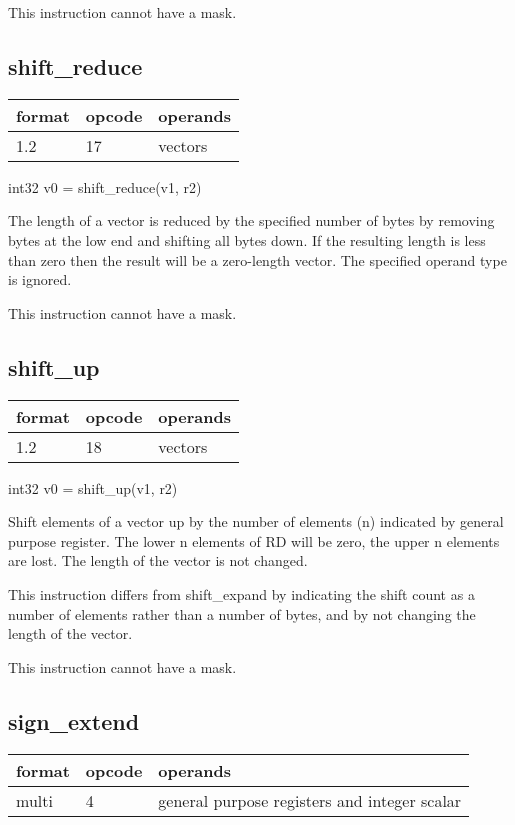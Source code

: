 \documentclass[forwardcom.tex]{subfiles}
\begin{document}
This instruction cannot have a mask.
\vv

\subsection{shift\_reduce}
\label{table:shiftReduceInstruction}
\begin{tabular}{|p{12mm}|p{15mm}|p{100mm}|}
\hline
\bfseries format & \bfseries opcode & \bfseries operands \\ \hline
1.2 & 17 & vectors \\ \hline
\end{tabular}
\vv

int32 v0 = shift\_reduce(v1, r2)
\vv

The length of a vector is reduced by the specified number of bytes by removing bytes at the low end and shifting all bytes down. If the resulting length is less than zero then the result will be a zero-length vector. The specified operand type is ignored.
\vv

This instruction cannot have a mask.
\vv

\subsection{shift\_up}
\label{table:shiftUpInstruction}
\begin{tabular}{|p{12mm}|p{15mm}|p{100mm}|}
\hline
\bfseries format & \bfseries opcode & \bfseries operands \\ \hline
1.2 & 18 & vectors \\ \hline
\end{tabular}
\vv

int32 v0 = shift\_up(v1, r2)
\vv

Shift elements of a vector up by the number of elements (n) indicated by general purpose register. 
The lower n elements of RD will be zero, the upper n elements are lost. The length of the vector is not changed.
\vv

This instruction differs from shift\_expand by indicating the shift count as a number of elements rather than a number of bytes, and by not changing the length of the vector.
\vv

This instruction cannot have a mask.
\vv

\subsection{sign\_extend}
\label{table:signExtendInstruction}
\begin{tabular}{|p{12mm}|p{15mm}|p{100mm}|}
\hline
\bfseries format & \bfseries opcode & \bfseries operands \\ \hline
multi & 4 & general purpose registers and integer scalar \\ \hline
\end{tabular}
\vv
\end{document}

